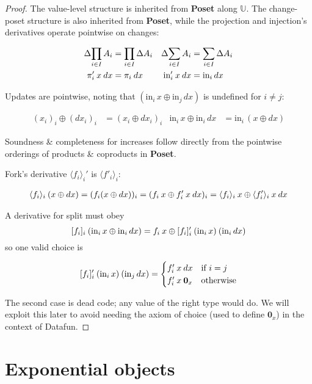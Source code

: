 \documentclass{rntz}\usepackage[a5]{rntzgeometry}\usepackage[fullwidth=13cm,width=315pt]{narrow}
\newcommand\mathvar[1]{\ensuremath{#1}} %
\newcommand\<{\mskip 4mu plus 4mu minus 1mu}
\newcommand\dx{\mathvar{dx}}
\newcommand\cat\textbf
\newcommand\Poset{\cat{Poset}}
\newcommand\D\Delta
\newcommand\injc{\textrm{in}}
\newcommand\inj[1]{\injc_{#1}\,}
\newcommand\zero{\ensuremath{\mathbold{0}}}
\newcommand\valfn{\ensuremath{\mathbb{U}}}
\newcommand\chgs[1]{\D{#1}}
\newcommand\deriv[1]{\ensuremath{#1'}}
\newcommand\upd{\mathbin{\oplus}}
\newcommand\fork[1]{\langle{#1}\rangle}
\newcommand\krof[1]{[{#1}]}
\begin{document}
\begin{proof}
  The value-level structure is inherited from \Poset{} along \valfn{}. The
  change-poset structure is also inherited from \Poset{}, while the projection
  and injection's derivatives operate pointwise on changes:

  \begin{align*}
    \chgs{\prod_{i \in I} A_i} &= \prod_{i \in I} \chgs A_i &
    \chgs{\sum_{i \in I} A_i} &= \sum_{i \in I} \chgs A_i
    \\
    \deriv\pi_i\<x\<\dx &= \pi_i\<\dx & \deriv\injc_i\<x\<\dx &= \inj i \dx
  \end{align*}

  \noindent Updates are pointwise, noting that $(\inj i x \upd \inj j \dx)$ is
  undefined for $i \ne j$:

  \begin{align*}
    (x_i)_i \upd (\dx_i)_i &= (x_i \upd \dx_i)_i &
    \inj i x \upd \inj i \dx &= \inj i (x \upd \dx)
  \end{align*}

  \noindent
  Soundness \& completeness for increases follow directly from the pointwise
  orderings of products \& coproducts in \Poset{}.

  Fork's derivative $\deriv{\fork{f_i}_i}$ is $\fork{\deriv f_i}_i$:

  \begin{gather*}
    \fork{f_i}_i \<(x \upd \dx)
    = (f_i(x \upd \dx))_i
    = (f_i\<x \upd \deriv f_i \<x \<\dx)_i
    = \fork{f_i}_i \<x \upd \fork{\deriv f_i}_i \<x \<\dx
  \end{gather*}

  \noindent
  A derivative for split must obey \[ \krof{f_i}_i\<(\inj i x \upd \inj i \dx)
  = f_i\<x \upd \deriv{\krof{f_i}_i} \<(\inj i x) \<(\inj i \dx) \] so one
  valid choice is

  \[\deriv{\krof{f_i}_i} \<(\inj i x) \<(\inj j \dx)
  = 
  \begin{cases}
    \deriv f_i \<x \<\dx & \text{if}~i = j\\
    \deriv f_i \<x \<\zero_x & \text{otherwise}
  \end{cases}
  \]

  \noindent
  The second case is dead code; any value of the right type would do. We will
  exploit this later to avoid needing the axiom of choice (used to define
  $\zero_x$) in the context of Datafun.
\end{proof}


\section{Exponential objects}
\end{document}
